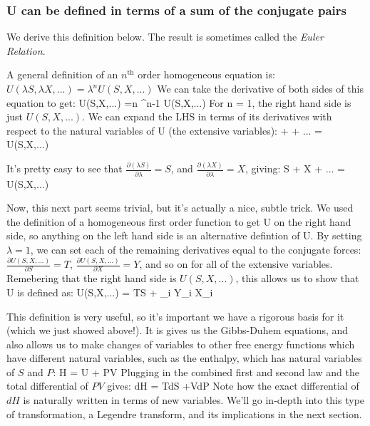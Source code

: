\documentclass[12pt]{article}
\begin{document}
\subsubsection{U can be defined in terms of a sum of the conjugate pairs}
We derive this definition below. The result is sometimes called the \emph{Euler Relation}.

A general definition of an $n^\text{th}$ order homogeneous equation is:
$U(\lambda S, \lambda X,...)=\lambda^n U(S,X,...)$
We can take the derivative of both sides of this equation to get:
\eqs
\frac{\partial}{\partial \lambda} U(\lambda S,\lambda X,...) =n \lambda^{n-1} U(S,X,...)
\eqe
For n = 1, the right hand side is just $U(S,X,...)$. We can expand the LHS in terms of its derivatives with respect to the natural variables of U (the extensive variables):
\eqs
{}  +   + ... = U(S,X,...)
\eqe

It's pretty easy to see that $\frac{\partial (\lambda S)}{\partial \lambda} = S$, and $\frac{\partial (\lambda X)}{\partial \lambda} = X$, giving:
\eqs
S  + X  + ... = U(S,X,...)
\eqe

Now, this next part seems trivial, but it's actually a nice, subtle trick. We used the definition of a homogeneous first order function to get U on the right hand side, so anything on the left hand side is an alternative defintion of U. By setting $\lambda = 1$, we can set each of the remaining derivatives equal to the conjugate forces:
$\frac{\partial U(S, X,...)}{\partial S} = T$, $\frac{\partial U(S, X,...)}{\partial X} = Y$, and so on for all of the extensive variables.
Remebering that the right hand side is $U(S,X,...)$, this allows us to show that U is defined as:
\eqs
U(S,X,...) = TS + \sum_i Y_i X_i
\eqe

This definition is very useful, so it's important we have a rigorous basis for it (which we just showed above!). It is gives us the Gibbs-Duhem equations, and also allows us to make changes of variables to other free energy functions which have different natural variables, such as the enthalpy, which has natural variables of $S$ and $P$:
\eqs H = U + PV \eqe
Plugging in the combined first and second law and the total differential of $PV$ gives:
\eqs dH = TdS +VdP \eqe
Note how the exact differential of $dH$ is naturally written in terms of new variables. We'll go in-depth into this type of transformation, a Legendre transform, and its implications in the next section.
\end{document}

